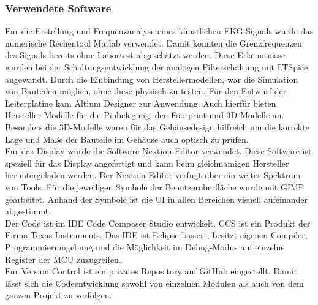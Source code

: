
\subsubsection{Verwendete Software}
Für die Erstellung und Frequenzanalyse eines künstlichen EKG-Signals wurde das numerische Rechentool Matlab verwendet. Damit konnten die Grenzfrequenzen des Signals bereits ohne Labortest abgeschätzt werden. Diese Erkenntnisse wurden bei der Schaltungsentwicklung der analogen Filterschaltung mit LTSpice angewandt. Durch die Einbindung von Herstellermodellen, war die Simulation von Bauteilen möglich, ohne diese physisch zu testen. Für den Entwurf der Leiterplatine kam Altium Designer zur Anwendung. Auch hierfür bieten Hersteller Modelle für die Pinbelegung, den Footprint und 3D-Modelle an. Besonders die 3D-Modelle waren für das Gehäusedesign hilfreich um die korrekte Lage und Maße der Bauteile im Gehäuse auch optisch zu prüfen.\\
Für das Display wurde die Software Nextion-Editor verwendet. Diese Software ist speziell für das Display angefertigt und kann beim gleichnamigen Hersteller heruntergeladen werden. Der Nextion-Editor verfügt über ein weites Spektrum von Tools. Für die jeweiligen Symbole der Benutzeroberfläche wurde mit GIMP gearbeitet. Anhand der Symbole ist die UI in allen Bereichen visuell aufeinander abgestimmt.\\
Der Code ist im IDE Code Composer Studio entwickelt. CCS ist ein Produkt der Firma Texas Instruments. Das IDE ist Eclipse-basiert, besitzt eigenen Compiler, Programmierumgebung und die Möglichkeit im Debug-Modus auf einzelne Register der MCU zuzugreifen.\\
Für Version Control ist ein privates Repository auf GitHub eingestellt. Damit lässt sich die Codeentwicklung sowohl von einzelnen Modulen als auch von dem ganzen Projekt zu verfolgen.\\


